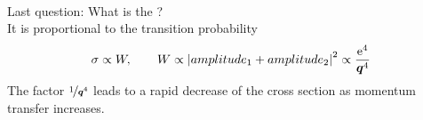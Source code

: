 \begin{example}
\begin{align*}
    \end{align*}
    Last question: What is the ?\\
    It is proportional to the transition probability
    \begin{align}
        \sigma \propto W, \qquad W \propto \qty| amplitude_1 + amplitude_2 |^2 \propto \frac{\mathrm{e}^4}{{\bm{q}}^4}
    \end{align}
    The factor $\nicefrac{1}{{\bm{q}}^4}$ leads to a rapid decrease of the cross section as momentum transfer increases.
    \begin{center}
    \end{center}
\end{example}
